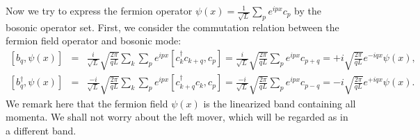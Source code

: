 \documentclass[aps,prb,superscriptaddress,nofootinbib]{revtex4}
\begin{document}
Now we try to express the fermion operator $\psi(x) = \frac{1}{\sqrt{L}} \sum_p e^{ipx} c_{p}$
by the bosonic operator set.
First, we consider the commutation relation between the fermion field operator and bosonic mode:
\begin{eqnarray}
	\left[b_q,\psi(x)\right] 
	&=& \frac{i}{\sqrt L}\sqrt{\frac{2\pi}{qL}}\sum_{k}\sum_{p} e^{ipx} [c^\dagger_{k}c_{k+q},c_{p}] 
	= \frac{i}{\sqrt L} \sqrt{\frac{2\pi}{qL}} \sum_{p} e^{ipx} c_{p+q} 
	= +i\sqrt{\frac{2\pi}{qL}} e^{-iqx} \psi(x), \label{eq:bs-comm-1} \\ 
	\left[b_q^\dagger,\psi(x)\right] 
	&=& \frac{-i}{\sqrt L}\sqrt{\frac{2\pi}{qL}}\sum_{k}\sum_{p} e^{ipx} [c^\dagger_{k+q}c_{k},c_{p}] 
	= \frac{-i}{\sqrt L} \sqrt{\frac{2\pi}{qL}} \sum_{p} e^{ipx} c_{p-q} 
	= -i\sqrt{\frac{2\pi}{qL}} e^{+iqx}\psi(x). \label{eq:bs-comm-2}
\end{eqnarray}
We remark here that the fermion field $\psi(x)$ is the linearized band containing all momenta.
We shall not worry about the left mover, which will be regarded as in a different band.
\end{document}
